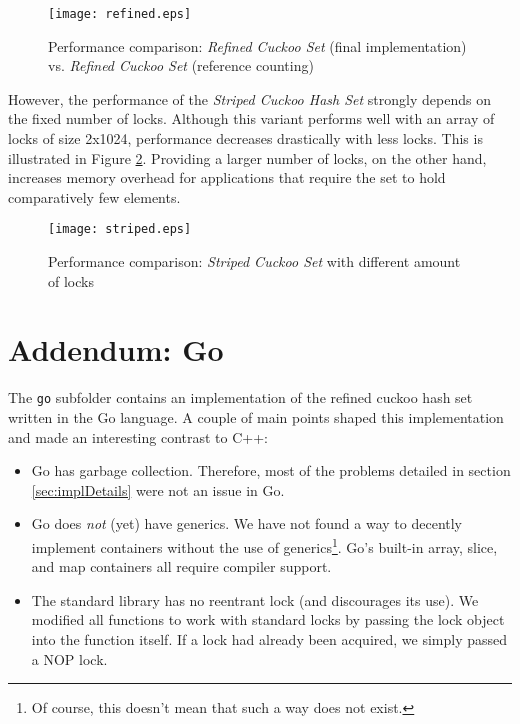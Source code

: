 \documentclass[a4paper,10pt]{article}
\begin{document}
\begin{figure}[H]
\begin{center}
\texttt{[image: refined.eps]}
\end{center}
\caption{Performance comparison: \emph{Refined Cuckoo Set} (final implementation) vs. \emph{Refined Cuckoo Set} (reference counting)}
\label{fig:plot4}
\end{figure}


However, the performance of the \emph{Striped Cuckoo Hash Set} strongly
depends on the fixed number of locks. Although this variant performs well
with an array of locks of size 2x1024, performance decreases drastically with
less locks. This is illustrated in Figure \ref{fig:plot3}. Providing a larger
number of locks, on the other hand, increases memory overhead for applications
that require the set to hold comparatively few elements.

\begin{figure}[H]
\begin{center}
\texttt{[image: striped.eps]}
\end{center}
\caption{Performance comparison: \emph{Striped Cuckoo Set} with different amount of locks}
\label{fig:plot3}
\end{figure}

\section{Addendum: Go}

The \verb|go| subfolder contains an implementation of the refined cuckoo hash set
written in the Go language. A couple of main points shaped this implementation
and made an interesting contrast to C++:

\begin{itemize}
\item Go has garbage collection. Therefore, most of the problems detailed in
    section \ref{sec:implDetails} were not an issue in Go.
\item Go does \emph{not} (yet) have generics. We have not found a way to
    decently implement containers without the use of generics\footnote{Of
    course, this doesn't mean that such a way does not exist.}. Go's built-in
    array, slice, and map containers all require compiler support.
\item The standard library has no reentrant lock (and discourages its use).
    We modified all functions to work with standard locks by passing the
    lock object into the function itself. If a lock had already been acquired,
    we simply passed a NOP lock.
\end{itemize}
\end{document}
